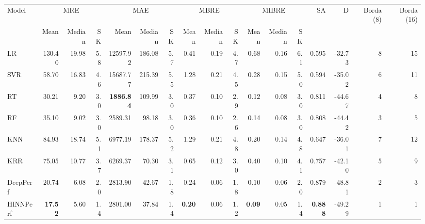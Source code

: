 \begin{tabular}{lrrrrrrrrrrrrrrrr}
\toprule
Model & \multicolumn{3}{c}{MRE} & \multicolumn{3}{c}{MAE} & \multicolumn{3}{c}{MBRE} & \multicolumn{3}{c}{MIBRE} & SA & D & Borda (8) & Borda (16) \\
 & Mean & Median & SK & Mean & Median & SK & Mean & Median & SK & Mean & Median & SK &  &  &  &  \\
\midrule
LR & 130.40 & 19.98 & 5.8 & 12597.92 & 186.08 & 5.7 & 0.41 & 0.19 & 4.7 & 0.68 & 0.16 & 6.1 & 0.595 & -32.73 & 8 & 15 \\
SVR & 58.70 & 16.83 & 4.6 & 15687.77 & 215.39 & 5.5 & 1.28 & 0.21 & 4.5 & 0.28 & 0.15 & 5.0 & 0.594 & -35.02 & 6 & 11 \\
RT & 30.21 & 9.20 & 3.0 & \textbf{1886.84} & 109.99 & 3.0 & 0.37 & 0.10 & 2.9 & 0.12 & 0.08 & 3.0 & 0.811 & -44.67 & 4 & 8 \\
RF & 35.10 & 9.02 & 3.0 & 2589.31 & 98.18 & 3.0 & 0.36 & 0.10 & 2.6 & 0.14 & 0.08 & 3.0 & 0.808 & -44.42 & 3 & 5 \\
KNN & 84.93 & 18.74 & 5.1 & 6977.19 & 178.37 & 5.2 & 1.29 & 0.21 & 4.8 & 0.20 & 0.14 & 4.8 & 0.647 & -36.01 & 7 & 12 \\
KRR & 75.05 & 10.77 & 3.7 & 6269.37 & 70.30 & 3.1 & 0.65 & 0.12 & 3.0 & 0.40 & 0.10 & 4.1 & 0.757 & -42.10 & 5 & 9 \\
DeepPerf & 20.74 & 6.08 & 2.0 & 2813.90 & 42.67 & 1.8 & 0.24 & 0.06 & 1.8 & 0.10 & 0.06 & 2.0 & 0.879 & -48.81 & 2 & 3 \\
HINNPerf & \textbf{17.52} & 5.60 & 1.4 & 2801.00 & 37.84 & 1.4 & \textbf{0.20} & 0.06 & 1.2 & \textbf{0.09} & 0.05 & 1.4 & \textbf{0.888} & -49.29 & 1 & 1 \\
\bottomrule
\end{tabular}
